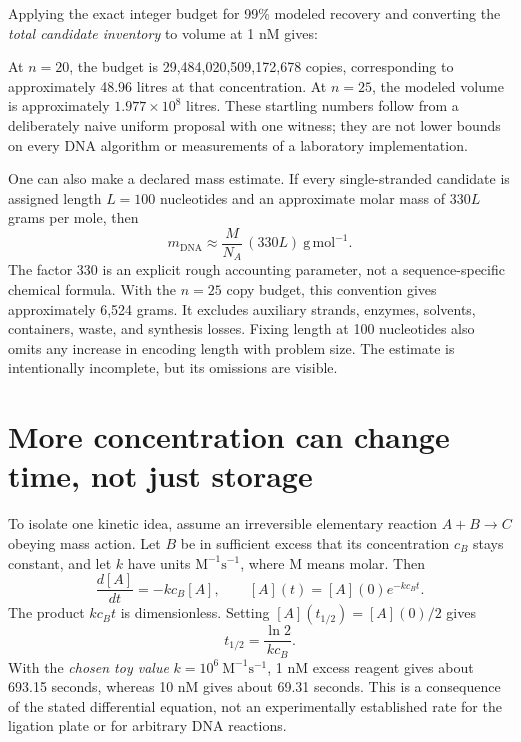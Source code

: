 Applying the exact integer budget for 99\% modeled recovery and converting the \emph{total candidate inventory} to volume at 1 nM gives:

\begin{center}\small\end{center}

At $n=20$, the budget is 29,484,020,509,172,678 copies, corresponding to approximately 48.96 litres at that concentration. At $n=25$, the modeled volume is approximately $1.977\times10^8$ litres. These startling numbers follow from a deliberately naive uniform proposal with one witness; they are not lower bounds on every DNA algorithm or measurements of a laboratory implementation.

One can also make a declared mass estimate. If every single-stranded candidate is assigned length $L=100$ nucleotides and an approximate molar mass of $330L$ grams per mole, then
\begin{equation}
m_{\mathrm{DNA}}\approx \frac{M}{N_A}\,(330L)\ \mathrm{g\,mol^{-1}}.
\label{eq:mass}
\end{equation}
The factor 330 is an explicit rough accounting parameter, not a sequence-specific chemical formula. With the $n=25$ copy budget, this convention gives approximately 6,524 grams. It excludes auxiliary strands, enzymes, solvents, containers, waste, and synthesis losses. Fixing length at 100 nucleotides also omits any increase in encoding length with problem size. The estimate is intentionally incomplete, but its omissions are visible.

\section{More concentration can change time, not just storage}

To isolate one kinetic idea, assume an irreversible elementary reaction $A+B\to C$ obeying mass action. Let $B$ be in sufficient excess that its concentration $c_B$ stays constant, and let $k$ have units $\mathrm{M}^{-1}\mathrm{s}^{-1}$, where $\mathrm M$ means molar. Then
\begin{equation}
\frac{d[A]}{dt}=-kc_B[A],\qquad
[A](t)=[A](0)e^{-kc_Bt}. \label{eq:kinetics}
\end{equation}
The product $kc_Bt$ is dimensionless. Setting $[A](t_{1/2})=[A](0)/2$ gives
\begin{equation}
t_{1/2}=\frac{\ln2}{kc_B}. \label{eq:halftime}
\end{equation}
With the \emph{chosen toy value} $k=10^6\ \mathrm{M}^{-1}\mathrm{s}^{-1}$, 1 nM excess reagent gives about 693.15 seconds, whereas 10 nM gives about 69.31 seconds. This is a consequence of the stated differential equation, not an experimentally established rate for the ligation plate or for arbitrary DNA reactions.

